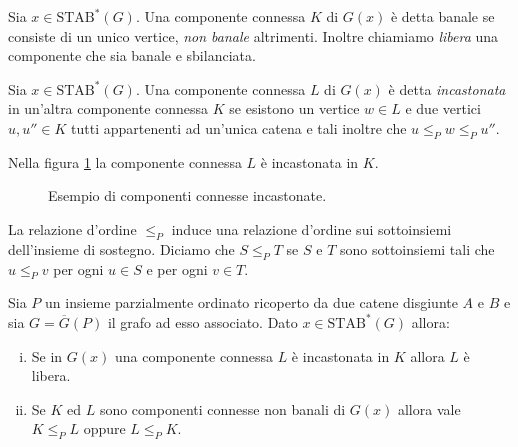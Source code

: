 \begin{definition}
	Sia \(x\in\text{STAB}^*(G)\). Una componente connessa \(K\) di \(G(x)\) è detta banale se consiste di un unico vertice, \emph{non banale} altrimenti. Inoltre chiamiamo \emph{libera} una componente che sia banale e sbilanciata. 
\end{definition}
\begin{definition}
	Sia \(x\in\text{STAB}^{*}(G)\). Una componente connessa \(L\) di \(G(x)\) è detta \emph{incastonata} in un'altra componente connessa \(K\) se esistono un vertice \(w\in L\) e due vertici \(u,u''\in K\) tutti appartenenti ad un'unica catena e tali inoltre che \(u\le_{P}w\le_{P}u''\). 
\end{definition}
\begin{example}
    Nella figura \ref{inlayexample} la componente connessa \(L\) \`e incastonata in \(K\).
    \begin{figure}
        \centering
        \caption{Esempio di componenti connesse incastonate.}
        \label{inlayexample}
    \end{figure}
\end{example}
La relazione d'ordine \(\le_{P}\) induce una relazione d'ordine sui sottoinsiemi dell'insieme di sostegno. Diciamo che \(S\le_{P}T\) se \(S\) e \(T\) sono sottoinsiemi tali che \(u\le_{P}v\) per ogni \(u\in S\) e per ogni \(v\in T\). 
\begin{lemma}
	\label{inlaylemma} Sia \(P\) un insieme parzialmente ordinato ricoperto da due catene disgiunte \(A\) e \(B\) e sia \(G=\overline{G}(P)\) il grafo ad esso associato. Dato \(x\in\text{STAB}^{*}(G)\) allora:
	\begin{enumerate}
		[(i)] 
		\item Se in \(G(x)\) una componente connessa \(L\) è incastonata in \(K\) allora \(L\) è libera. 
		\item Se \(K\) ed \(L\) sono componenti connesse non banali di \(G(x)\) allora vale \(K\le_{P}L\) oppure \(L\le_{P}K\). 
	\end{enumerate}
\end{lemma}
